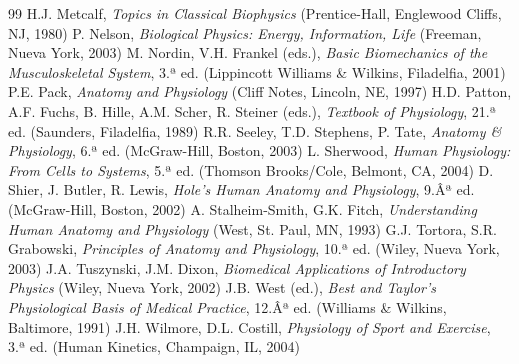 ﻿\documentclass{book}
\begin{document}
\begin{thebibliography}{99}
 H.J. Metcalf, \textit{Topics in Classical Biophysics} (Prentice-Hall, Englewood Cliffs, NJ, 1980)
 P. Nelson, \textit{Biological Physics: Energy, Information, Life} (Freeman, Nueva York, 2003)
 M. Nordin, V.H. Frankel (eds.), \textit{Basic Biomechanics of the Musculoskeletal System}, 3.ª ed. (Lippincott Williams \& Wilkins, Filadelfia, 2001)
 P.E. Pack, \textit{Anatomy and Physiology} (Cliff Notes, Lincoln, NE, 1997)
 H.D. Patton, A.F. Fuchs, B. Hille, A.M. Scher, R. Steiner (eds.), \textit{Textbook of Physiology}, 21.ª ed. (Saunders, Filadelfia, 1989)
 R.R. Seeley, T.D. Stephens, P. Tate, \textit{Anatomy \& Physiology}, 6.ª ed. (McGraw-Hill, Boston, 2003)
 L. Sherwood, \textit{Human Physiology: From Cells to Systems}, 5.ª ed. (Thomson Brooks/Cole, Belmont, CA, 2004)
 D. Shier, J. Butler, R. Lewis, \textit{Hole's Human Anatomy and Physiology}, 9.Âª ed. (McGraw-Hill, Boston, 2002)
 A. Stalheim-Smith, G.K. Fitch, \textit{Understanding Human Anatomy and Physiology} (West, St. Paul, MN, 1993)
 G.J. Tortora, S.R. Grabowski, \textit{Principles of Anatomy and Physiology}, 10.ª ed. (Wiley, Nueva York, 2003)
 J.A. Tuszynski, J.M. Dixon, \textit{Biomedical Applications of Introductory Physics} (Wiley, Nueva York, 2002)
 J.B. West (ed.), \textit{Best and Taylor's Physiological Basis of Medical Practice}, 12.Âª ed. (Williams \& Wilkins, Baltimore, 1991)
 J.H. Wilmore, D.L. Costill, \textit{Physiology of Sport and Exercise}, 3.ª ed. (Human Kinetics, Champaign, IL, 2004)
\end{thebibliography}

\end{document}
